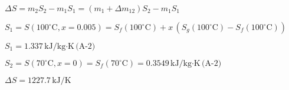 \(\Delta S = m_2 S_2 - m_1 S_1 = (m_1 + \Delta m_{12}) S_2 - m_1 S_1\)  

\(S_1 = S(100^\circ \text{C}, x = 0.005) = S_f(100^\circ \text{C}) + x \, (S_g(100^\circ \text{C}) - S_f(100^\circ \text{C}))\)  

\(S_1 = 1.337 \, \text{kJ/kg·K} \, \text{(A-2)}\)  

\(S_2 = S(70^\circ \text{C}, x = 0) = S_f(70^\circ \text{C}) = 0.3549 \, \text{kJ/kg·K} \, \text{(A-2)}\)  

\(\Delta S = 1227.7 \, \text{kJ/K}\)